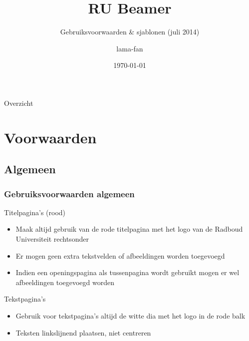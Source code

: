 \documentclass[xcolor=table,10pt,t]{beamer}
\title{RU Beamer}
\subtitle{Gebruiksvoorwaarden \& sjablonen (juli 2014)}
\date{\today}
\author{lama-fan}
\begin{document}
\begin{frame}
    \titlepage
\end{frame}

\begin{frame}{Overzicht}
    \tableofcontents
\end{frame}

\section{Voorwaarden}
\subsection{Algemeen}
\begin{frame}
    \frametitle{Gebruiksvoorwaarden algemeen}

    \begin{block}{Titelpagina's (rood)}
        \begin{itemize}
            \item Maak altijd gebruik van de rode titelpagina met het logo van de Radboud Universiteit rechtsonder
            \item Er mogen geen extra tekstvelden of afbeeldingen worden toegevoegd
            \item Indien een openingspagina als tussenpagina wordt gebruikt mogen er wel afbeeldingen toegevoegd worden
        \end{itemize}
    \end{block}

    \begin{block}{Tekstpagina's}
        \begin{itemize}
            \item Gebruik voor tekstpagina's altijd de witte dia met het logo in de rode balk
            \item Teksten linkslijnend plaatsen, niet centreren
        \end{itemize}
    \end{block}
\end{frame} 
\end{document}
